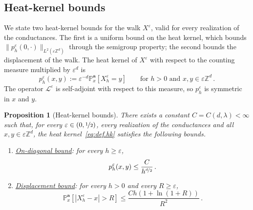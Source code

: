 \documentclass[11pt]{amsart}
\newtheorem{proposition}[theorem]{Proposition}
\numberwithin{equation}{section}
\newcommand{\Z}{\mathbb{Z}}
\newcommand{\PP}{\mathbb{P}}
\newcommand{\ba}{\mathbf{a}}
\newcommand{\eps}{\varepsilon}
\newcommand{\Leps}{\mathcal{L}^\varepsilon}
\newcommand{\nf}{\nicefrac}
\begin{document}
\subsection{Heat-kernel bounds} \label{sec:hk}

We state two heat-kernel bounds for the walk $X^\eps$, valid for every realization of the conductances.
The first is a uniform bound on the heat kernel, which bounds $\|p^\eps_h(0, \cdot)\|_{L^2(\eps \Z^d)}$ through the semigroup property; the second bounds the displacement of the walk.
The heat kernel of $X^\eps$ with respect to the counting measure multiplied by $\eps^d$ is
\begin{equation} \label{eq:def.hk}
    p^\eps_h(x, y) := \eps^{-d} \PP^\ba_x \left[ X^\eps_h = y \right] \qquad \text{for } h > 0 \text{ and } x, y \in \eps \Z^d\,.
\end{equation}
The operator $\Leps$ is self-adjoint with respect to this measure, so $p^\eps_h$ is symmetric in $x$ and $y$.

\begin{proposition}[Heat-kernel bounds] \label{prop:hk}
There exists a constant $C = C(d, \lambda) < \infty$ such that, for every $\eps \in (0, \nf12)$, every realization of the conductances and all $x, y \in \eps \Z^d$, the heat kernel~\eqref{eq:def.hk} satisfies the following bounds.
\begin{enumerate}
    \item[\textup{(i)}] \underline{\emph{On-diagonal bound}}: for every $h \geq \eps$,
    \begin{equation} \label{eq:hk.diag}
        p^\eps_h(x, y) \leq \frac{C}{h^{\nf{d}{2}}}\,.
    \end{equation}
    \item[\textup{(ii)}] \underline{\emph{Displacement bound}}: for every $h > 0$ and every $R \geq \eps$,
    \begin{equation} \label{eq:hk.displacement}
        \PP^\ba_x \left[ |X^\eps_h - x| > R \right] \leq \frac{C h \left( 1 + \ln (1 + R) \right)}{R^2}\,.
    \end{equation}
\end{enumerate}
\end{proposition}
\end{document}
